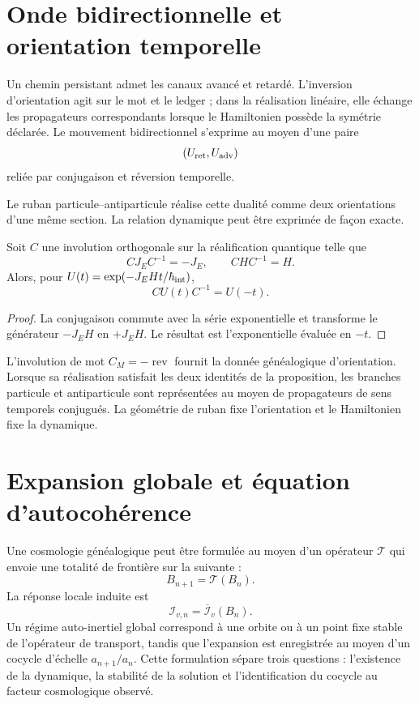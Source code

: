 \section{Onde bidirectionnelle et orientation temporelle}

Un chemin persistant admet les canaux avancé et retardé. L'inversion
d'orientation agit sur le mot et le ledger ; dans la réalisation linéaire,
elle échange les propagateurs correspondants lorsque le Hamiltonien possède la
symétrie déclarée. Le mouvement bidirectionnel s'exprime au moyen d'une paire
\[
 (U_{\rm ret},U_{\rm adv})
\]
reliée par conjugaison et réversion temporelle.

Le ruban particule--antiparticule réalise cette dualité comme deux orientations
d'une même section. La relation dynamique peut être exprimée de façon exacte.

\begin{proposition}
Soit \(C\) une involution orthogonale sur la réalification quantique telle que
\[
 C J_E C^{-1}=-J_E,
 \qquad
 C H C^{-1}=H.
\]
Alors, pour
\(U(t)=\exp(-J_EHt/\hbar_{\rm int})\),
\[
 C U(t)C^{-1}=U(-t).
\]
\end{proposition}

\begin{proof}
La conjugaison commute avec la série exponentielle et transforme le générateur
\(-J_EH\) en \(+J_EH\). Le résultat est l'exponentielle évaluée en
\(-t\).
\end{proof}

L'involution de mot \(C_M=-\operatorname{rev}\) fournit la donnée
généalogique d'orientation. Lorsque sa réalisation satisfait les deux
identités de la proposition, les branches particule et antiparticule sont
représentées au moyen de propagateurs de sens temporels conjugués. La
géométrie de ruban fixe l'orientation et le Hamiltonien fixe la dynamique.

\section{Expansion globale et équation d'autocohérence}

Une cosmologie généalogique peut être formulée au moyen d'un opérateur
\(\mathcal T\) qui envoie une totalité de frontière sur la suivante :
\[
 B_{n+1}=\mathcal T(B_n).
\]
La réponse locale induite est
\[
 \mathcal I_{v,n}=\overline{\mathcal I}_v(B_n).
\]
Un régime auto-inertiel global correspond à une orbite ou à un point fixe stable
de l'opérateur de transport, tandis que l'expansion est enregistrée au moyen d'un
cocycle d'échelle \(a_{n+1}/a_n\). Cette formulation sépare trois questions :
l'existence de la dynamique, la stabilité de la solution et l'identification du
cocycle au facteur cosmologique observé.

